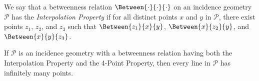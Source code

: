 \documentclass{article}
\begin{document}
\begin{dfn}
We say that a betweenness relation $\Between{\cdot}{\cdot}{\cdot}$ on an incidence geometry $\mathcal{P}$ has the \emph{Interpolation Property} if for all distinct points $x$ and $y$ in $\mathcal{P}$, there exist points $z_1$, $z_2$, and $z_3$ such that $\Between{z_1}{x}{y}$, $\Between{x}{z_2}{y}$, and $\Between{x}{y}{z_3}$.
\end{dfn}

\begin{prop}
If $\mathcal{P}$ is an incidence geometry with a betweenness relation having both the Interpolation Property and the 4-Point Property, then every line in $\mathcal{P}$ has infinitely many points.
\end{prop}
\end{document}
